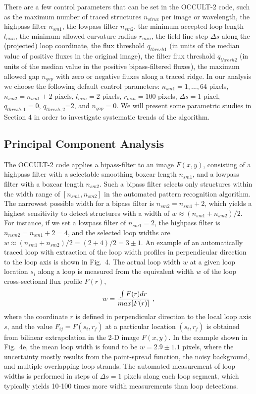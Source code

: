 \documentclass[10pt,preprint]{aastex}  %
\begin{document}
There are a few control parameters that can be set in the
OCCULT-2 code, such as 
the maximum number of traced structures $n_{struc}$ per image or 
wavelength, the highpass filter $n_{sm1}$, the lowpass filter $n_{sm2}$,
the minimum accepted loop length $l_{min}$, the minimum allowed
curvature radius $r_{min}$, the field line step $\Delta s$ along
the (projected) loop coordinate, the flux threshold $q_{thresh1}$
(in units of the median value of positive fluxes in the original
image), the filter flux threshold $q_{thresh2}$ (in units
of the median value in the positive bipass-filtered fluxes),
the maximum allowed gap $n_{gap}$ with zero or negative fluxes along
a traced ridge. In our analysis we choose the following default control
parameters: $n_{sm1}=1,...,64$ pixels, $n_{sm2}=n_{sm1}+2$ pixels,
$l_{min}=2$ pixels, $r_{min}=100$ pixels, $\Delta s=1$ pixel, 
$q_{thresh,1}=0$, $q_{thresh,2}$=2, and $n_{gap}=0$.
We will present some parametric studies in Section 4 in order to 
investigate systematic trends of the algorithm.

\subsection{	Principal Component Analysis			}

The OCCULT-2 code applies
a bipass-filter to an image $F(x,y)$, consisting of a highpass
filter with a selectable smoothing boxcar length $n_{sm1}$, and
a lowpass filter with a boxcar length $n_{sm2}$. Such a bipass 
filter selects only structures within the width range of $[n_{sm1}, 
n_{sm2}]$ in the automated pattern recognition algorithm.
The narrowest possible width for a bipass filter is 
$n_{sm2}=n_{sm1}+2$, which yields a highest sensitivity to
detect structures with a width of $w \approx (n_{sm1}+n_{sm2})/2$. 
For instance, if we set a lowpass filter of $n_{sm1}=2$, the
highpass filter is $n_{nsm2}=n_{sm1}+2=4$, and the selected
loop widths are $w \approx (n_{sm1}+n_{sm2})/2 = (2+4)/2=3 \pm 1$.
An example of an automatically traced loop with extraction
of the loop width profiles in perpendicular direction to the
loop axis is shown in Fig.~4. The actual loop width $w$ at a
given loop location $s_i$ along a loop is measured from the
equivalent width $w$ of the loop cross-sectional flux profile
$F(r)$, 
\begin{equation}
	w = {\int F(r) dr \over max[F(r)] } \ ,
\end{equation}
where the coordinate $r$ is defined in perpendicular
direction to the local loop axis $s$, and the value $F_{ij}=F(s_i, r_j)$
at a particular location $(s_i, r_j)$ is obtained from bilinear
extrapolation in the 2-D image $F(x,y)$. In the example shown
in Fig.~4e, the mean loop width is found to be $w=2.9\pm1.1$ pixels,
where the uncertainty mostly results from the point-spread function,
the noisy background, and multiple overlapping loop strands.
The automated measurement of loop widths is performed in steps
of $\Delta s = 1$ pixels along each loop segment, which typically
yields 10-100 times more width measurements than loop detections.
\end{document}
